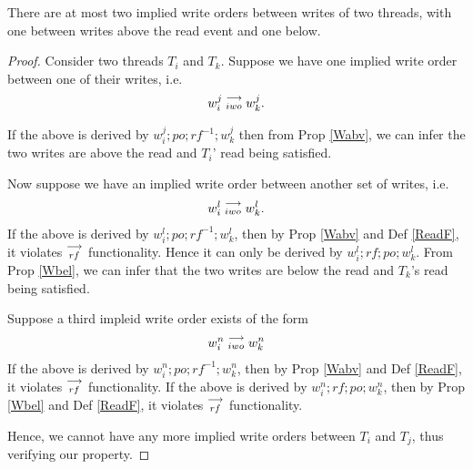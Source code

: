
    \begin{property}
        \label{prop4}
        There are at most two implied write orders between writes of two threads, with one between writes above the read event and one below. 
    \end{property}
        
    \begin{proof}
        Consider two threads $T_i$ and $T_k$. Suppose we have one implied write order between one of their writes, i.e. 
        \begin{align*}
            w_i^j\stackrel{\longrightarrow}{_{iwo}}w_k^j.    
        \end{align*}

        If the above is derived by $w_i^j;po;rf^{-1};w_k^j$ then from Prop \ref{Wabv}, we can infer the two writes are above the read and $T_i$' read being satisfied.  

        Now suppose we have an implied write order between another set of writes, i.e.
        \begin{align*}
            w_i^l\stackrel{\longrightarrow}{_{iwo}}w_k^l.    
        \end{align*}
        If the above is derived by $w_i^l;po;rf^{-1};w_k^l$, then by Prop \ref{Wabv} and Def \ref{ReadF}, it violates $\stackrel{\longrightarrow}{_{rf}}$ functionality. Hence it can only be derived by $w_i^l;rf;po;w_k^l$. From Prop \ref{Wbel}, we can infer that the two writes are below the read and $T_k$'s read being satisfied.  
        
        Suppose a third impleid write order exists of the form 
        \begin{align*}
            w_i^n\stackrel{\longrightarrow}{_{iwo}}w_k^n
        \end{align*}
        If the above is derived by $w_i^n;po;rf^{-1};w_k^n$, then by Prop \ref{Wabv} and Def \ref{ReadF}, it violates $\stackrel{\longrightarrow}{_{rf}}$ functionality. If the above is derived by $w_i^n;rf;po;w_k^n$, then by Prop \ref{Wbel} and Def \ref{ReadF}, it violates $\stackrel{\longrightarrow}{_{rf}}$ functionality.
        
        Hence, we cannot have any more implied write orders between $T_i$ and $T_j$, thus verifying our property. 
    \end{proof}
        

